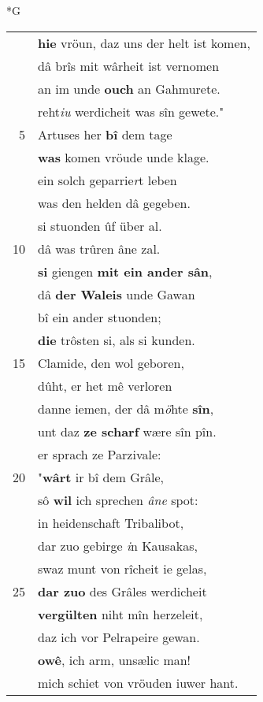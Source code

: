 \documentclass[8pt,a4paper,notitlepage]{article}
\begin{document}
\newpage
\begin{table}[ht]
\begin{minipage}[t]{0.5\linewidth}
\small
\begin{center}*G
\end{center}
\begin{tabular}{rl}
 & \textbf{hie} vröun, daz uns der helt ist komen,\\ 
 & dâ brîs mit wârheit ist vernomen\\ 
 & an im unde \textbf{ouch} an Gahmurete.\\ 
 & reht\textit{iu} werdicheit was sîn gewete."\\ 
5 & Artuses her \textbf{bî} dem tage\\ 
 & \textbf{was} komen vröude unde klage.\\ 
 & ein solch geparrie\textit{r}t leben\\ 
 & was den helden dâ gegeben.\\ 
 & si stuonden ûf über al.\\ 
10 & dâ was trûren âne zal.\\ 
 & \textbf{si} giengen \textbf{mit ein ander sân},\\ 
 & dâ \textbf{der Waleis} unde Gawan\\ 
 & bî ein ander stuonden;\\ 
 & \textbf{die} trôsten si, als si kunden.\\ 
15 & Clamide, den wol geboren,\\ 
 & dûht, er het mê verloren\\ 
 & danne iemen, der dâ m\textit{ö}hte \textbf{sîn},\\ 
 & unt daz \textbf{ze scharf} wære sîn pîn.\\ 
 & er sprach ze Parzivale:\\ 
20 & "\textbf{wârt} ir bî dem Grâle,\\ 
 & sô \textbf{wil} ich sprechen \textit{âne} spot:\\ 
 & in heidenschaft Tribalibot,\\ 
 & dar zuo gebirge \textit{i}n Kausakas,\\ 
 & swaz munt von rîcheit ie gelas,\\ 
25 & \textbf{dar zuo} des Grâles werdicheit\\ 
 & \textbf{vergülten} niht mîn herzeleit,\\ 
 & daz ich vor Pelrapeire gewan.\\ 
 & \textbf{owê}, ich arm, unsælic man!\\ 
 & mich schiet von vröuden iuwer hant.\\ 

\end{tabular}
\end{minipage}
\end{table}
\end{document}
